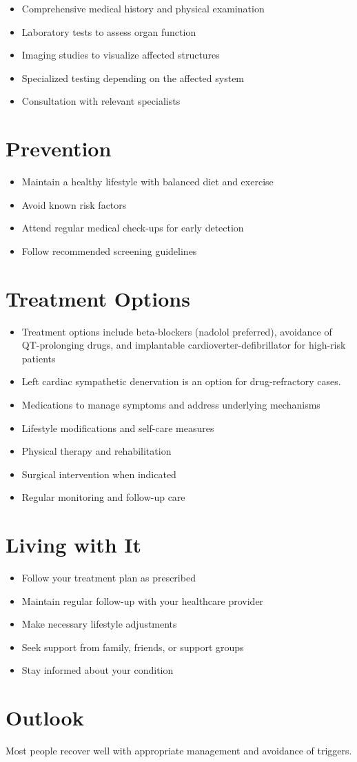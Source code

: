 \begin{itemize}[noitemsep]
  \item Comprehensive medical history and physical examination
  \item Laboratory tests to assess organ function
  \item Imaging studies to visualize affected structures
  \item Specialized testing depending on the affected system
  \item Consultation with relevant specialists
\end{itemize}
\section{Prevention}
\begin{itemize}[noitemsep]
  \item Maintain a healthy lifestyle with balanced diet and exercise
  \item Avoid known risk factors
  \item Attend regular medical check-ups for early detection
  \item Follow recommended screening guidelines
\end{itemize}
\section{Treatment Options}
\begin{itemize}[noitemsep]
  \item Treatment options include beta-blockers (nadolol preferred), avoidance of QT-prolonging drugs, and implantable cardioverter-defibrillator for high-risk patients
  \item Left cardiac sympathetic denervation is an option for drug-refractory cases.
  \item Medications to manage symptoms and address underlying mechanisms
  \item Lifestyle modifications and self-care measures
  \item Physical therapy and rehabilitation
  \item Surgical intervention when indicated
  \item Regular monitoring and follow-up care
\end{itemize}
\section{Living with It}
\begin{itemize}[noitemsep]
  \item Follow your treatment plan as prescribed
  \item Maintain regular follow-up with your healthcare provider
  \item Make necessary lifestyle adjustments
  \item Seek support from family, friends, or support groups
  \item Stay informed about your condition
\end{itemize}
\section{Outlook}
Most people recover well with appropriate management and avoidance of triggers.
